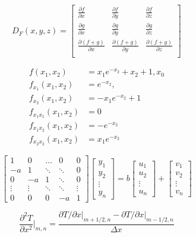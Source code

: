 $$
	D_F (x,y,z)=
	\begin{bmatrix}
		\frac{\partial f}{\partial x} & \frac{\partial f}{\partial y} & \frac{\partial f}{\partial z}\\
		\frac{\partial g}{\partial x} & \frac{\partial g}{\partial y} & \frac{\partial g}{\partial z}\\
		\frac{\partial (f+g)}{\partial x} & \frac{\partial (f+g)}{\partial y} & \frac{\partial (f+g)}{\partial z}\\
	\end{bmatrix}
$$

\begin{align*}
	f(x_1,x_2)  &= x_1e^{-x_2} + x_2 + 1, x_0\\
	f_{x_1}(x_1,x_2) &= e^{-x_2},  \\
	f_{x_2}(x_1,x_2) &= -x_1e^{-x_2} +1  \\
	f_{{x_1}{x_1}}(x_1,x_2) &= 0  \\
	f_{{x_1}{x_2}}(x_1,x_2) &= -e^{-x_2}  \\
	f_{{x_2}{x_2}}(x_1,x_2) &= x_1e^{-x_2}  
\end{align*}

\[
	\begin{bmatrix}
		1 & 0 & \hdots & 0 & 0 \\
		-a & 1 & \ddots & \ddots & 0 \\
		0 & -a & 1 & \ddots & 0 \\
		\vdots & \vdots & \ddots & \ddots	 & \vdots \\
		0 & 0 & 0 & -a & 1 
	\end{bmatrix}
	\begin{bmatrix}
		y_1 \\
		y_2 \\
		\vdots \\
		y_n 
	\end{bmatrix} 
	=
	b
	\begin{bmatrix}
		u_1 \\
		u_2 \\
		\vdots \\
		u_n 
	\end{bmatrix}
	+
	\begin{bmatrix}
		v_1 \\
		v_2 \\
		\vdots \\
		v_n 
	\end{bmatrix}
\]

\begin{equation*}
	\frac{\partial^2T}{\partial x^2}\Bigg\vert_{m,n} = \frac{\partial T/\partial x\vert_{m+1/2,n}-\partial T/\partial x\vert_{m-1/2,n}}{\Delta x}
\end{equation*}

